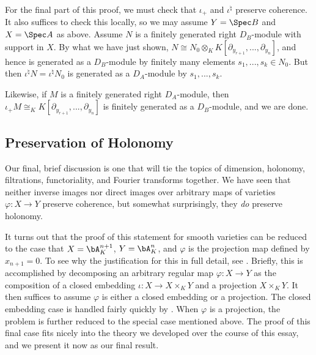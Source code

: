 \begin{prf}
	For the final part of this proof, we must check that $\iota_+$ and $\iota^\natural$ preserve coherence. It also suffices to check this locally, so we may assume $Y = \Spec B$ and $X = \Spec A$ as above. Assume $N$ is a finitely generated right $D_{B}$-module with support in $X$. By what we have just shown, $N \cong N_0\otimes_K K[\partial_{y_{r+1}},...,\partial_{y_n}]$, and hence is generated as a $D_{B}$-module by finitely many elements $s_1,...,s_k \in N_0$. But then $\iota^\natural N = \iota^\natural N_0$ is generated as a $D_{A}$-module by $s_1,...,s_k$.

	Likewise, if $M$ is a finitely generated right $D_{A}$-module, then $\iota_+M\cong_K K[\partial_{y_{r+1}},...,\partial_{y_n}]$ is finitely generated as a $D_{B}$-module, and we are done.
\end{prf}

\subsection{Preservation of Holonomy}

Our final, brief discussion is one that will tie the topics of dimension, holonomy, filtrations, functoriality, and Fourier transforms together. We have seen that neither inverse images nor direct images over arbitrary maps of varieties $\varphi:X\to Y$ preserve coherence, but somewhat surprisingly, they \emph{do} preserve holonomy. 

It turns out that the proof of this statement for smooth varieties can be reduced to the case that $X = \bA^{n+1}_K$, $Y = \bA^{n}_K$, and $\varphi$ is the projection map defined by $x_{n+1} = 0$. To see why the justification for this in full detail, see \cite[Chapter 3]{d-mod_ps-rt}. Briefly, this is accomplished by decomposing an arbitrary regular map $\varphi:X\to Y$ as the composition of a closed embedding $\iota:X\to X\times_KY$ and a projection $X\times_KY$. It then suffices to assume $\varphi$ is either a closed embedding or a projection. The closed embedding case is handled fairly quickly by \cite[Lemma 3.2.5]{d-mod_ps-rt}. When $\varphi$ is a projection, the problem is further reduced to the special case mentioned above. The proof of this final case fits nicely into the theory we developed over the course of this essay, and we present it now as our final result.

